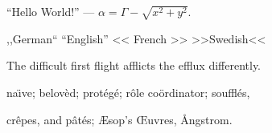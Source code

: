 \documentclass{article}
\begin{document}
``Hello World!'' --- $\alpha = \Gamma -\sqrt{x^2+y^2}$.

,,German`` ``English'' << French >>  >>Swedish<<

The difficult first flight afflicts the efflux differently.

na\"\i ve; belov\`ed; prot\'eg\'e; r\^ole co\"ordinator; souffl\'es, 

cr\^epes, and p\^at\'es; \AE sop's \OE uvres, \AA ngstrom.
\end{document}
